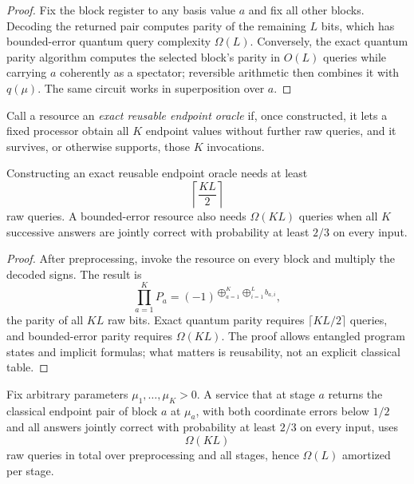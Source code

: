 \begin{proof}
Fix the block register to any basis value $a$ and fix all other blocks.
Decoding the returned pair computes parity of the remaining $L$ bits, which
has bounded-error quantum query complexity $\Omega(L)$.  Conversely, the
exact quantum parity algorithm computes the selected block's parity in
$O(L)$ queries while carrying $a$ coherently as a spectator; reversible
arithmetic then combines it with $q(\mu)$.  The same circuit works in
superposition over $a$.
\end{proof}

Call a resource an \emph{exact reusable endpoint oracle} if, once
constructed, it lets a fixed processor obtain all $K$ endpoint values without
further raw queries, and it survives, or otherwise supports, those $K$
invocations.

\begin{theorem}
\label{thm:prec-reusable-endpoints}
Constructing an exact reusable endpoint oracle needs at least
\begin{equation}
 \boxed{\left\lceil\frac{KL}{2}\right\rceil}             \label{eq:prec-reusable-cost}
\end{equation}
raw queries.  A bounded-error resource also needs $\Omega(KL)$ queries when
all $K$ successive answers are jointly correct with probability at least
$2/3$ on every input.
\end{theorem}

\begin{proof}
After preprocessing, invoke the resource on every block and multiply the
decoded signs.  The result is
\[
 \prod_{a=1}^KP_a=(-1)^{\bigoplus_{a=1}^K\bigoplus_{i=1}^Lb_{a,i}},
\]
the parity of all $KL$ raw bits.  Exact quantum parity requires
$\lceil KL/2\rceil$ queries, and bounded-error parity requires $\Omega(KL)$.
The proof allows entangled program states and implicit formulas; what matters
is reusability, not an explicit classical table.
\end{proof}

\begin{theorem}
\label{thm:prec-lazy-trajectory}
Fix arbitrary parameters $\mu_1,\ldots,\mu_K>0$.  A service that at stage
$a$ returns the classical endpoint pair of block $a$ at $\mu_a$, with both
coordinate errors below $1/2$ and all answers jointly correct with probability
at least $2/3$ on every input, uses
\begin{equation}
 \boxed{\Omega(KL)}                                      \label{eq:prec-trajectory-cost}
\end{equation}
raw queries in total over preprocessing and all stages, hence $\Omega(L)$
amortized per stage.
\end{theorem}

